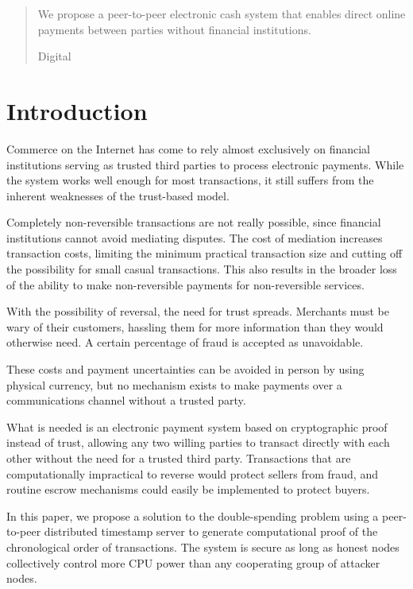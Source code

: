 \documentclass{article}
\begin{document}
\begin{abstract}
We propose a peer-to-peer electronic cash system that enables direct online payments between parties without financial institutions.

Digital
\end{abstract}

\section*{Introduction}

Commerce on the Internet has come to rely almost exclusively on financial institutions serving as trusted third parties to process electronic payments. While the system works well enough for most transactions, it still suffers from the inherent weaknesses of the trust-based model.

Completely non-reversible transactions are not really possible, since financial institutions cannot avoid mediating disputes. The cost of mediation increases transaction costs, limiting the minimum practical transaction size and cutting off the possibility for small casual transactions. This also results in the broader loss of the ability to make non-reversible payments for non-reversible services.

With the possibility of reversal, the need for trust spreads. Merchants must be wary of their customers, hassling them for more information than they would otherwise need. A certain percentage of fraud is accepted as unavoidable.

These costs and payment uncertainties can be avoided in person by using physical currency, but no mechanism exists to make payments over a communications channel without a trusted party.

What is needed is an electronic payment system based on cryptographic proof instead of trust, allowing any two willing parties to transact directly with each other without the need for a trusted third party. Transactions that are computationally impractical to reverse would protect sellers from fraud, and routine escrow mechanisms could easily be implemented to protect buyers.

In this paper, we propose a solution to the double-spending problem using a peer-to-peer distributed timestamp server to generate computational proof of the chronological order of transactions. The system is secure as long as honest nodes collectively control more CPU power than any cooperating group of attacker nodes.
\end{document}

